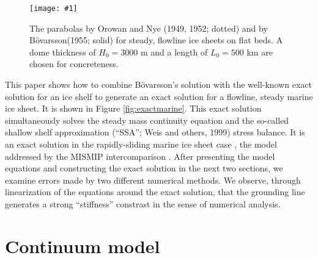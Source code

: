 \documentclass[twocolumn]{igs}
\renewcommand{\dh}{\fontencoding{T1}\selectfont{\symbol{240}}}
\newcommand{\onecol}[1]{\texttt{[image: \#1]}}
\newcommand{\bod}{B\"o\dh varsson\xspace}
\begin{document}
\begin{figure}[ht]
\onecol{twoparabolas}
\caption{The parabolas by Orowan and Nye (1949, 1952; dotted) and by \bod (1955; solid) for steady, flowline ice sheets on flat beds.  A dome thickness of $H_0=3000$ m and a length of $L_0=500$ km are chosen for concreteness.} \label{fig:twoparabolas}
\end{figure}

This paper shows how to combine \bod's solution with the well-known exact solution for an ice shelf \citep{vanderVeen83,vanderVeen} to generate an exact solution for a flowline, steady marine ice sheet.  It is shown in Figure \ref{fig:exactmarine}.  This exact solution simultaneously solves the steady mass continuity equation and the so-called shallow shelf approximation (``SSA''; Weis and others, 1999)\nocite{WeisGreveHutter} stress balance.  It is an exact solution in the rapidly-sliding marine ice sheet case \citep{SchoofMarine1}, the model addressed by the MISMIP intercomparison \citep{MISMIP2012}.  After presenting the model equations and constructing the exact solution in the next two sections, we examine errors made by two different numerical methods.  We observe, through linearization of the equations around the exact solution, that the grounding line generates a strong ``stiffness'' constrast in the sense of numerical analysis.


\section{Continuum model}
\end{document}
